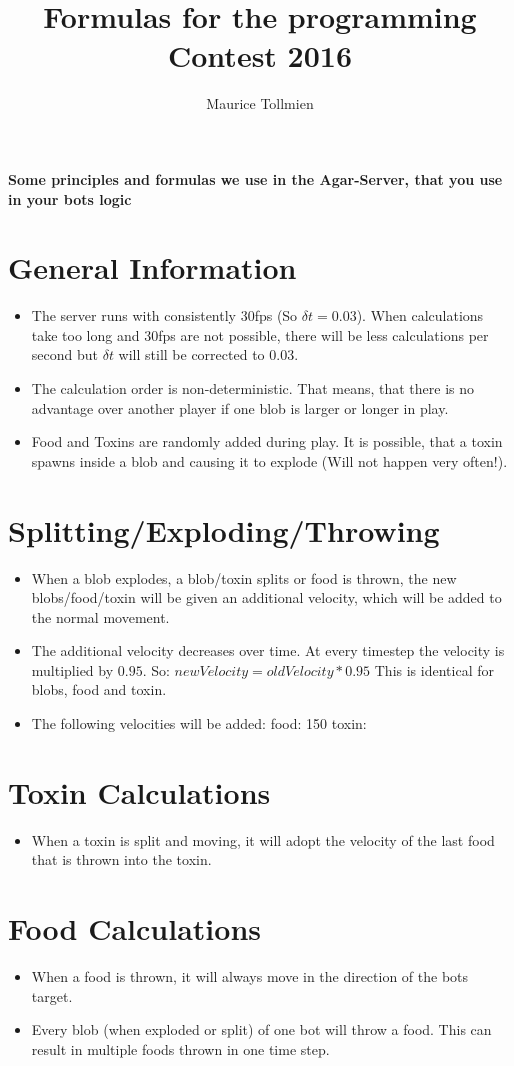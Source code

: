 \documentclass[10pt,a4paper]{article}
\author{Maurice Tollmien}
\title{Formulas for the programming Contest 2016}
\begin{document}
\thispagestyle{empty}
\begin{center}
\textbf{\large{Some principles and formulas we use in the Agar-Server, that you use in your bots logic}}
\end{center}

\section{General Information}
\begin{itemize}
\item The server runs with consistently 30fps (So $\delta t = 0.03$). \newline
      When calculations take too long and 30fps are not possible, there will be less calculations per second
      but $\delta t$ will still be corrected to 0.03.
\item The calculation order is non-deterministic. That means, that there is no advantage over another player 
	  if one blob is larger or longer in play.
\item Food and Toxins are randomly added during play. It is possible, that a toxin spawns 
      inside a blob and causing it to explode (Will not happen very often!).

\end{itemize}      
      
\section{Splitting/Exploding/Throwing}
\begin{itemize}
\item When a blob explodes, a blob/toxin splits or food is thrown, the new blobs/food/toxin will be given an
      additional velocity, which will be added to the normal movement.
\item The additional velocity decreases over time. At every timestep the velocity is multiplied by $0.95$. \newline
      So: $newVelocity = oldVelocity * 0.95$ \newline
      This is identical for blobs, food and toxin.	
\item The following velocities will be added: \newline
      food:  150 \newline
      toxin: 
\end{itemize}

\section{Toxin Calculations}
\begin{itemize}
\item When a toxin is split and moving, it will adopt the velocity of the last food that is thrown into the toxin.
\end{itemize}

\section{Food Calculations}
\begin{itemize}
\item When a food is thrown, it will always move in the direction of the bots target.
\item Every blob (when exploded or split) of one bot will throw a food. This can result in multiple foods thrown 
      in one time step.
\end{itemize}
\end{document}

